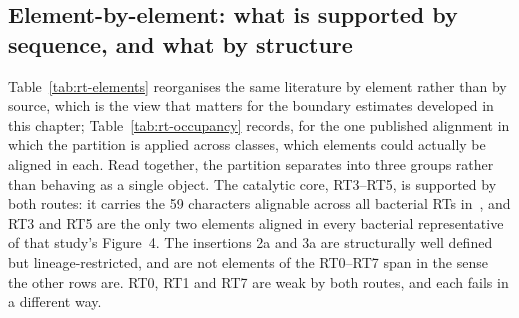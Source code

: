 
\subsection{Element-by-element: what is supported by sequence, and what by structure}
\label{sec:rt-partition-elements}

Table~\ref{tab:rt-elements} reorganises the same literature by element rather than by
source, which is the view that matters for the boundary estimates developed in this
chapter; Table~\ref{tab:rt-occupancy} records, for the one published alignment in which
the partition is applied across classes, which elements could actually be aligned in
each. Read together, the partition separates into three groups rather than behaving as a
single object. The catalytic core, RT3--RT5, is supported by both routes: it carries the
59 characters alignable across all bacterial RTs in~\cite{simon2008}, and RT3 and RT5 are
the only two elements aligned in every bacterial representative of that study's Figure~4.
The insertions 2a and 3a are structurally well defined but lineage-restricted, and are
not elements of the RT0--RT7 span in the sense the other rows are. RT0, RT1 and RT7 are
weak by both routes, and each fails in a different way.

